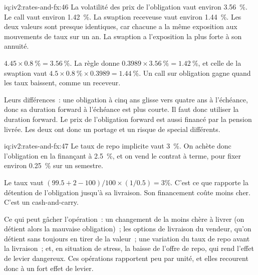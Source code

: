 \begin{solution}{iq:iv2:rates-and-fx:46}
La volatilité des prix de l'obligation vaut environ 3.56~\%. Le call vaut environ 1.42~\%. La swaption receveuse vaut environ 1.44~\%. Les deux valeurs sont presque identiques, car chacune a la même exposition aux mouvements de taux sur un an. La swaption a l'exposition la plus forte à son annuité.

$4.45 \times 0.8~\% = 3.56~\%$. La règle donne $0.3989 \times 3.56~\% = 1.42~\%$, et celle de la swaption vaut $4.5 \times 0.8~\% \times 0.3989 = 1.44~\%$. Un call sur obligation gagne quand les taux baissent, comme un receveur.

Leurs différences~: une obligation à cinq ans glisse vers quatre ans à l'échéance, donc sa duration forward à l'échéance est plus courte. Il faut donc utiliser la duration forward. Le prix de l'obligation forward est aussi financé par la pension livrée. Les deux ont donc un portage et un risque de special différents.

\end{solution}

\begin{solution}{iq:iv2:rates-and-fx:47}
Le taux de repo implicite vaut 3~\%. On achète donc l'obligation en la finançant à 2.5~\%, et on vend le contrat à terme, pour fixer environ 0.25~\% sur un semestre.

Le taux vaut $(99.5 + 2 - 100)/100 \times (1/0.5) = 3\%$. C'est ce que rapporte la détention de l'obligation jusqu'à sa livraison. Son financement coûte moins cher. C'est un cash-and-carry.

Ce qui peut gâcher l'opération~: un changement de la moins chère à livrer (on détient alors la mauvaise obligation)~; les options de livraison du vendeur, qu'on détient sans toujours en tirer de la valeur~; une variation du taux de repo avant la livraison~; et, en situation de stress, la baisse de l'offre de repo, qui rend l'effet de levier dangereux. Ces opérations rapportent peu par unité, et elles recourent donc à un fort effet de levier.

\end{solution}

